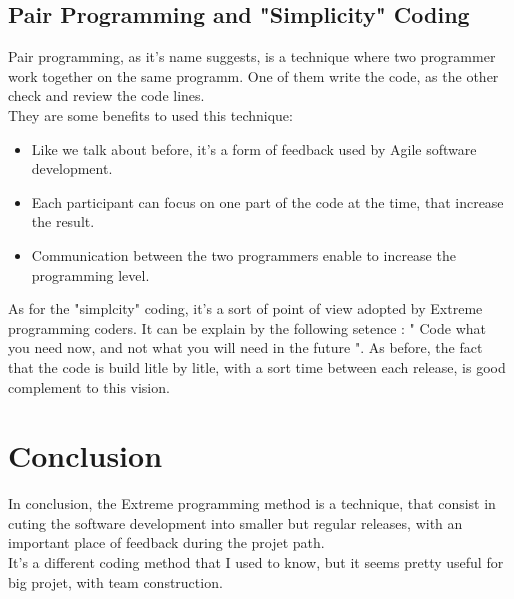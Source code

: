 \documentclass[french,english,12pt]{article}
\begin{document}
\subsection{Pair Programming and "Simplicity" Coding}

Pair programming, as it's name suggests, is a technique where two programmer work together on the same programm.
One of them write the code, as the other check and review the code lines.\\

They are some benefits to used this technique:
\begin{itemize}
\item  Like we talk about before, it's a form of feedback used by Agile software development.
\item Each participant can focus on one part of the code at the time, that increase the result.
\item Communication between the two programmers enable to increase the programming level.
\end{itemize}
\vspace{1 cm}
As for the "simplcity" coding, it's a sort of point of view adopted by Extreme programming coders. It can be explain by the following setence : " Code what you need now, and not what you will need in the future ".
As before, the fact that the code is build litle by litle, with a sort time between each release, is good complement to this vision. 

\section{Conclusion}

In conclusion, the Extreme programming method is a technique, that consist in cuting the software development into smaller but regular releases, with an important place of feedback during the projet path.\\

It's a different coding method that I used to know, but it seems pretty useful for big projet, with team construction.
\end{document}
